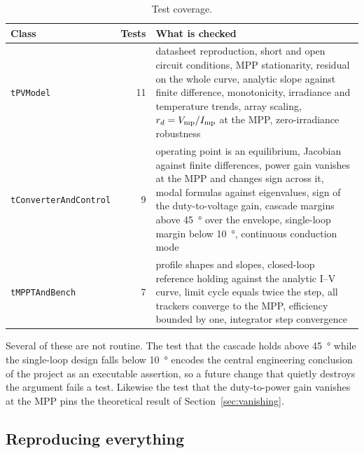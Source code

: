 \begin{table}[htbp]
\centering
\caption{Test coverage.}
\label{tab:tests}
\begin{tabular}{@{}L{0.30\textwidth}rL{0.48\textwidth}@{}}
\toprule
\textbf{Class} & \textbf{Tests} & \textbf{What is checked} \\
\midrule
\texttt{tPVModel} & 11 & datasheet reproduction, short and open circuit conditions, MPP stationarity, residual on the whole curve, analytic slope against finite difference, monotonicity, irradiance and temperature trends, array scaling, $r_d = V_{\mathrm{mp}}/I_{\mathrm{mp}}$ at the MPP, zero-irradiance robustness \\
\texttt{tConverterAndControl} & 9 & operating point is an equilibrium, Jacobian against finite differences, power gain vanishes at the MPP and changes sign across it, modal formulas against eigenvalues, sign of the duty-to-voltage gain, cascade margins above \SI{45}{\degree} over the envelope, single-loop margin below \SI{10}{\degree}, continuous conduction mode \\
\texttt{tMPPTAndBench} & 7 & profile shapes and slopes, closed-loop reference holding against the analytic I--V curve, limit cycle equals twice the step, all trackers converge to the MPP, efficiency bounded by one, integrator step convergence \\
\bottomrule
\end{tabular}
\end{table}

Several of these are not routine. The test that the cascade holds above
\SI{45}{\degree} while the single-loop design falls below \SI{10}{\degree}
encodes the central engineering conclusion of the project as an executable
assertion, so a future change that quietly destroys the argument fails a test.
Likewise the test that the duty-to-power gain vanishes at the MPP pins the
theoretical result of Section~\ref{sec:vanishing}.

\subsection{Reproducing everything}

